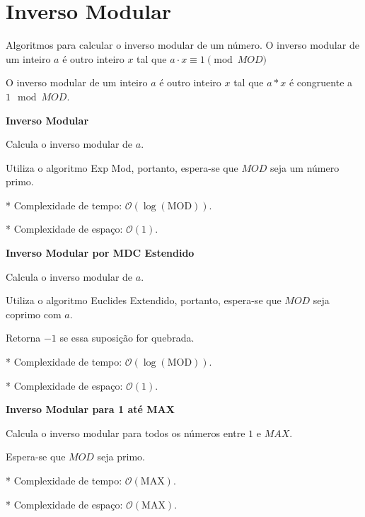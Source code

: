 \documentclass[10pt, a4paper, oneside]{book}
\begin{document}
\section{Inverso Modular}


Algoritmos para calcular o inverso modular de um número. O inverso modular de um inteiro $a$ é outro inteiro $x$ tal que $a \cdot x \equiv 1 \pmod{MOD}$



O inverso modular de um inteiro $a$ é outro inteiro $x$ tal que $a * x$ é congruente a $1 \mod MOD$.



\textbf{Inverso Modular} 



Calcula o inverso modular de $a$.



Utiliza o algoritmo Exp Mod, portanto, espera-se que $MOD$ seja um número primo.



* Complexidade de tempo: $\mathcal{O}(\log(\text{MOD}))$.

* Complexidade de espaço: $\mathcal{O}(1)$.



\textbf{Inverso Modular por MDC Estendido} 



Calcula o inverso modular de $a$.



Utiliza o algoritmo Euclides Extendido, portanto, espera-se que $MOD$ seja coprimo com $a$.



Retorna $-1$ se essa suposição for quebrada.



* Complexidade de tempo: $\mathcal{O}(\log(\text{MOD}))$.

* Complexidade de espaço: $\mathcal{O}(1)$.



\textbf{Inverso Modular para 1 até MAX} 



Calcula o inverso modular para todos os números entre $1$ e $MAX$.



Espera-se que $MOD$ seja primo.



* Complexidade de tempo: $\mathcal{O}(\text{MAX})$.

* Complexidade de espaço: $\mathcal{O}(\text{MAX})$.
\end{document}
